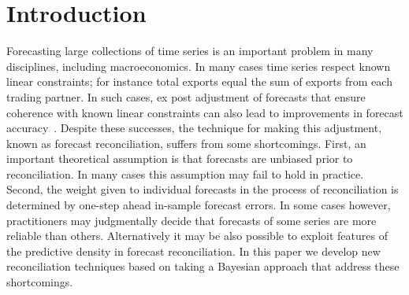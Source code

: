 \documentclass[a4paper,fleqn,11pt]{article}
\begin{document}
			




\section{Introduction}
\label{sec:intro}
Forecasting large collections of time series is an important problem in many disciplines, including macroeconomics.  In many cases time series respect known linear constraints; for instance total exports equal the sum of exports from each trading partner. In such cases, ex post adjustment of forecasts that ensure coherence with known linear constraints can also lead to improvements in forecast accuracy~\citep[see][and references therein]{Wickramasuriya2015}. Despite these successes, the technique for making this adjustment, known as forecast reconciliation, suffers from some shortcomings.  First, an important theoretical assumption is that forecasts are unbiased prior to reconciliation.  In many cases this assumption may fail to hold in practice.  Second, the weight given to individual forecasts in the process of reconciliation is determined by one-step ahead in-sample forecast errors.  In some cases however, practitioners may judgmentally decide that forecasts of some series are more reliable than others.  Alternatively it may be also possible to exploit features of the predictive density in forecast reconciliation.  In this paper we develop new reconciliation techniques based on taking a Bayesian approach that address these shortcomings.
\end{document}
